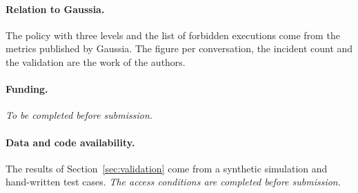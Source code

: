 \documentclass[11pt,a4paper]{article}
\begin{document}
\paragraph{Relation to Gaussia.} The policy with three levels and the list of forbidden executions come from the
metrics published by Gaussia. The figure per conversation, the incident count and the validation are the work of
the authors.

\paragraph{Funding.} \textit{To be completed before submission.}

\paragraph{Data and code availability.} The results of Section~\ref{sec:validation} come from a synthetic
simulation and hand-written test cases. \textit{The access conditions are completed before submission.}



\end{document}
